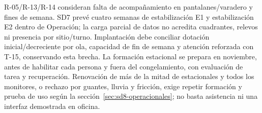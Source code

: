R-05/R-13/R-14 consideran falta de acompañamiento en pantalanes/varadero y fines de semana. SD7 prevé cuatro semanas de estabilización E1 y estabilización E2 dentro de Operación; la carga parcial de datos no acredita cuadrantes, relevos ni presencia por sitio/turno. Implantación debe conciliar dotación inicial/decreciente por ola, capacidad de fin de semana y atención reforzada con T-15, conservando esta brecha. La formación estacional se prepara en noviembre, antes de habilitar cada persona y fuera del congelamiento, con evaluación de tarea y recuperación. Renovación de más de la mitad de estacionales y todos los monitores, o rechazo por guantes, lluvia y fricción, exige repetir formación y prueba de uso según la sección~\ref{sec:sd8-operacionales}; no basta asistencia ni una interfaz demostrada en oficina. \parencites[RT-20.05--06; p.~35]{sd8-bt}[RT-22.04; numerales 13.3 y 17.6]{sd8-c07}

